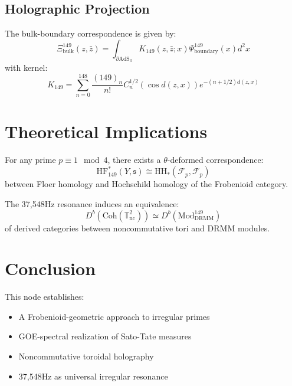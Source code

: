 \documentclass[12pt]{article}
\begin{document}
\subsection{Holographic Projection}
The bulk-boundary correspondence is given by:
\begin{equation}
\Xi_{\text{bulk}}^{149}(z,\bar{z}) = \int_{\partial\text{AdS}_3} K_{149}(z,\bar{z};x)\Psi_{\text{boundary}}^{149}(x)d^2x
\end{equation}
with kernel:
\begin{equation}
K_{149} = \sum_{n=0}^{148} \frac{(149)_n}{n!}C_n^{1/2}(\cos d(z,x))e^{-(n+1/2)d(z,x)}
\end{equation}

\section{Theoretical Implications}
\begin{theorem}
For any prime $p \equiv 1 \mod 4$, there exists a $\theta$-deformed correspondence:
\begin{equation}
\text{HF}^*_{149}(Y,\mathfrak{s}) \cong \text{HH}_*(\mathcal{F}_p,\mathcal{F}_p)
\end{equation}
between Floer homology and Hochschild homology of the Frobenioid category.
\end{theorem}

\begin{conjecture}
The 37,548Hz resonance induces an equivalence:
\begin{equation}
D^b(\text{Coh}(\mathbb{T}^2_{\text{nc}})) \simeq D^b(\text{Mod}_{\text{DRMM}}^{149})
\end{equation}
of derived categories between noncommutative tori and DRMM modules.
\end{conjecture}

\section*{Conclusion}
This node establishes:
\begin{itemize}
    \item A Frobenioid-geometric approach to irregular primes
    \item GOE-spectral realization of Sato-Tate measures
    \item Noncommutative toroidal holography
    \item 37,548Hz as universal irregular resonance
\end{itemize}
\end{document}
